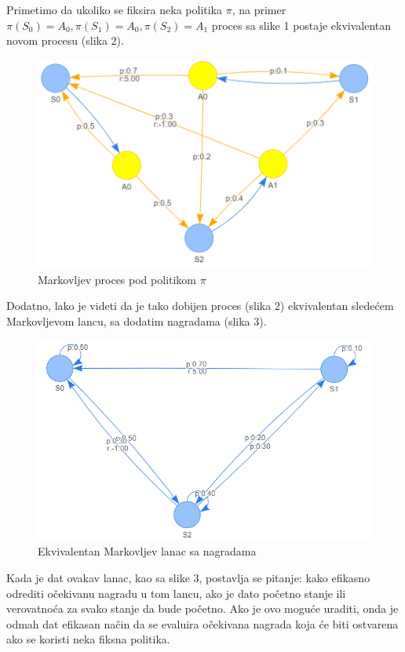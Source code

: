 \documentclass[a4paper,fleqn,12pt]{JMThesis}
\theoremstyle{plain}
\theoremstyle{definition}
\theoremstyle{definition}
\begin{document}
Primetimo da ukoliko se fiksira neka politika $\pi$, na primer $\pi(S_0)=A_0, \pi(S_1)=A_0, \pi(S_2)=A_1$ proces sa slike 1 postaje ekvivalentan novom procesu (slika 2).
\begin{figure}[!ht]
	\centering
	\includegraphics[scale=0.4]{../graph-visuals/example-mdp-given-policy.png}
	\caption{Markovljev proces pod politikom $\pi$}
\end{figure}

Dodatno, lako je videti da je tako dobijen proces (slika 2) ekvivalentan sledećem Markovljevom lancu, sa dodatim nagradama (slika 3).
\begin{figure}[!ht]
	\centering
	\includegraphics[scale=0.4]{../graph-visuals/example-mdp-given-policy-chain.png}
	\caption{Ekvivalentan Markovljev lanac sa nagradama}
\end{figure}
Kada je dat ovakav lanac, kao sa slike 3, postavlja se pitanje: kako efikasno odrediti očekivanu nagradu u tom lancu, ako je dato početno stanje ili verovatnoća za svako stanje da bude početno. Ako je ovo moguće uraditi, onda je odmah dat efikasan način da se evaluira očekivana nagrada koja će biti ostvarena ako se koristi neka fiksna politika.\\
\end{document}

